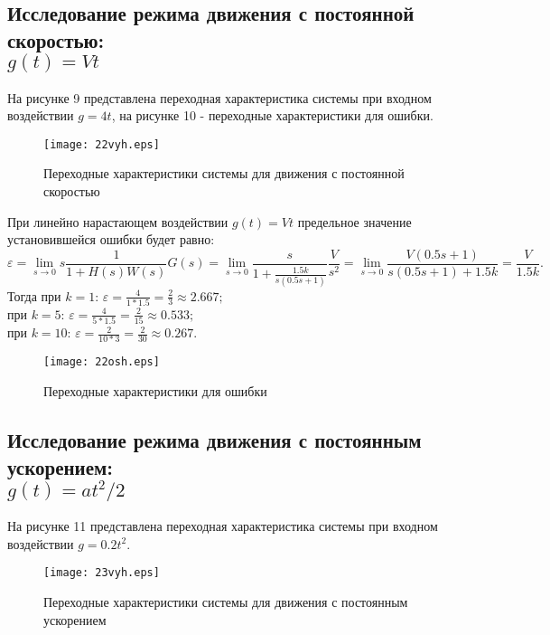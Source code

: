 \documentclass[12pt,a4paper]{article}
\begin{document}
\subsection{Исследование режима движения с постоянной скоростью: \\$g(t)=Vt$} 
На рисунке 9 представлена переходная характеристика системы при входном воздействии $g=4t$, на рисунке 10  - переходные характеристики для ошибки.
\begin{figure}[H]
	\centering
	\texttt{[image: 22vyh.eps]}
	\caption{Переходные характеристики системы для движения с постоянной скоростью}
\end{figure}
При линейно нарастающем воздействии $g(t)=Vt$ предельное значение установившейся ошибки будет равно:
\begin{equation}
    \varepsilon = \lim_{s\to 0}s\frac{1}{1+H(s)W(s)}G(s) = \lim_{s\to 0}\frac{s}{1 + \displaystyle{\frac{1.5k}{s(0.5s+1)}}}\frac{V}{s^2} = \lim_{s\to0} \frac{V(0.5s+1)}{s(0.5s+1)+1.5k}= \frac{V}{1.5k}.
\end{equation}
Тогда при $k=1$: $\varepsilon = \displaystyle{\frac{4}{1*1.5} = \frac{2}{3} \approx  2.667;}$\\
при $k=5$: $\varepsilon = \displaystyle{\frac{4}{5*1.5} = \frac{2}{15} \approx  0.533;}$\\
при $k=10$: $\varepsilon = \displaystyle{\frac{2}{10*3} = \frac{2}{30} \approx  0.267.}$
\begin{figure}[H]
	\centering
	\texttt{[image: 22osh.eps]}
	\caption{Переходные характеристики для ошибки}
\end{figure}

\subsection{Исследование режима движения с постоянным ускорением: \\$g(t)=at^2/2$} 
На рисунке 11 представлена переходная характеристика системы при входном воздействии $g=0.2t^2$.
\begin{figure}[H]
	\centering
	\texttt{[image: 23vyh.eps]}
	\caption{Переходные характеристики системы для движения с постоянным ускорением}
\end{figure}
\end{document}
